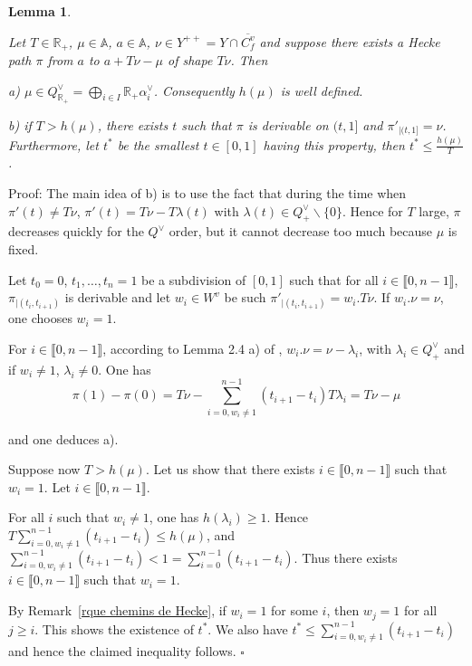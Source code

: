 \documentclass[12pt]{article}
\theoremstyle{plain}
\newtheorem{lemme}[thm]{Lemma}
\theoremstyle{definition}
\newcommand{\R}{\mathbb{R}}
\newcommand{\A}{\mathbb{A}}
\begin{document}
\begin{lemme}\label{lemme fin des chemins de Hecke longs}


Let $T\in \mathbb{R}_+$, $\mu\in \A$,  $a\in \mathbb{A}$, $\nu\in Y^{++}=Y\cap\overline{C^v_f}$ and suppose there exists a Hecke path $\pi$ from $a$ to $a+T\nu-\mu$ of shape $T\nu$. Then 

a) $\mu\in Q^\vee_{\R_+}=\bigoplus_{i\in I}\R_+\alpha_i^\vee$. Consequently $h(\mu)$ is well defined.

b) if $T>h(\mu)$, there exists $t$ such that $\pi$ is derivable on $(t,1]$ and $\pi'_{|(t,1]}=\nu$. Furthermore, let $t^*$ be the smallest $t \in [0,1]$ having this property, then $t^*\leq \frac{h(\mu)}{T}$.
\end{lemme}


Proof: The main idea of b) is to use the fact that during the time when $\pi'(t)\neq T\nu$, $\pi'(t)=T\nu-T\lambda(t)$ with $\lambda(t)\in Q^\vee_+\backslash \{0\}$. Hence for $T$ large, $\pi$ decreases quickly for the $Q^\vee$ order, but it cannot decrease too much because $\mu$ is fixed.

Let $t_0=0$, $t_1, \ldots,t_n=1$ be a subdivision of $[0,1]$ such that for all $i\in \llbracket 0,n-1\rrbracket $, $\pi_{|(t_i,t_{i+1})}$ is derivable and let $w_i\in W^v$ be such $\pi'_{|(t_i,t_{i+1})}=w_i.T\nu$. If $w_i.\nu=\nu$, one chooses $w_i=1$.

For $i\in \llbracket 0,n-1\rrbracket$, according to Lemma 2.4 a) of \cite{gaussent2008kac}, $w_i.\nu =\nu -\lambda_i$, with $\lambda_i \in Q^\vee_+$ and if $w_i\neq 1$, $\lambda_i\neq 0$. One has \[\pi(1)-\pi(0)=T\nu-\sum_{i=0, w_i\neq 1}^{n-1}(t_{i+1}-t_i)T\lambda_i=T\nu -\mu\]

and one deduces a).


Suppose now $T>h(\mu)$. Let us show that there exists $i\in \llbracket 0,n-1\rrbracket$ such that $w_i=1$. Let $i\in \llbracket 0,n-1\rrbracket$. 

For all $i$ such that $w_i\neq 1$, one has $h(\lambda_i)\geq 1$. Hence $T\sum_{i=0, w_i\neq 1}^{n-1}(t_{i+1}-t_i)\leq h(\mu)$, and $\sum_{i=0, w_i\neq 1}^{n-1}(t_{i+1}-t_i)<1=\sum_{i=0}^{n-1}(t_{i+1}-t_i)$. Thus there exists $i\in \llbracket 0,n-1\rrbracket$ such that $w_i=1$.

By Remark~\ref{rque chemins de Hecke}, if $w_i=1$ for some $i$, then $w_j=1$ for all $j\geq i$. This shows the existence of $t^*$. We also have $t^*\leq \sum_{i=0, w_i\neq 1}^{n-1}(t_{i+1}-t_i)$ and hence the claimed inequality follows. $\square$
\end{document}
